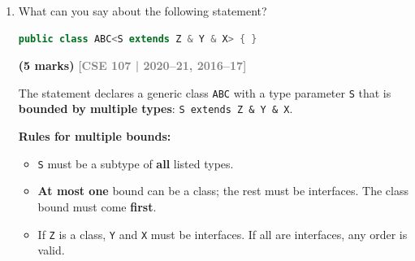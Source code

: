 \documentclass[12pt,a3paper]{article}
\newcommand{\yr}[1]{\hfill\textcolor{gray}{\small\textbf{[#1]}}}
\newcommand{\mk}[1]{\textcolor{orange!70!black}{\small\textbf{(#1 marks)}}}
\begin{document}
\begin{enumerate}
\begin{tcolorbox}
\begin{lstlisting}[language=Java]
interface iStack<T extends Number> {
    void    push(T item);
    T       pop();
    boolean isEmpty();
}

class Stack<T extends Number> implements iStack<T> {
    private ArrayList<T> data = new ArrayList<>();

    @Override
    public void push(T item) { data.add(item); }

    @Override
    public T pop() {
        if (isEmpty()) throw new RuntimeException("Stack is empty");
        return data.remove(data.size() - 1);
    }

    @Override
    public boolean isEmpty() { return data.isEmpty(); }

    @Override
    public String toString() { return data.toString(); }
}

class StackDemo {
    public static void main(String[] args) {
        Stack<Integer> s = new Stack<>();
        s.push(1); s.push(2); s.push(3);
        System.out.println("Stack: " + s);
        System.out.println("Pop: "   + s.pop());
        System.out.println("Pop: "   + s.pop());
        System.out.println("Stack: " + s);
        System.out.println("Empty: " + s.isEmpty());
    }
}
\end{lstlisting}
\textbf{Output:}
\begin{verbatim}
Stack: [1, 2, 3]
Pop: 3
Pop: 2
Stack: [1]
Empty: false
\end{verbatim}
\end{tcolorbox}



\item What can you say about the following statement?
\begin{lstlisting}[language=Java]
public class ABC<S extends Z & Y & X> { }
\end{lstlisting}
\mk{5}
\yr{CSE 107 | 2020--21, 2016--17}

\begin{tcolorbox}[enhanced,breakable,ansbox,
  colback=cG!4,colframe=cG,boxrule=0.8pt,arc=5pt,
  title={\textbf{Answer --- Bounded Type Parameter with Multiple Bounds}},
  fonttitle=\bfseries\color{white},colbacktitle=cG]

The statement declares a generic class \texttt{ABC} with a type
parameter \texttt{S} that is \textbf{bounded by multiple types}:
\texttt{S extends Z \& Y \& X}.

\textbf{Rules for multiple bounds:}
\begin{itemize}[itemsep=2pt]
  \item \texttt{S} must be a subtype of \textbf{all} listed types.
  \item \textbf{At most one} bound can be a class; the rest must be
  interfaces. The class bound must come \textbf{first}.
  \item If \texttt{Z} is a class, \texttt{Y} and \texttt{X} must be
  interfaces. If all are interfaces, any order is valid.
\end{itemize}


\end{tcolorbox}
\end{enumerate}
\end{document}
